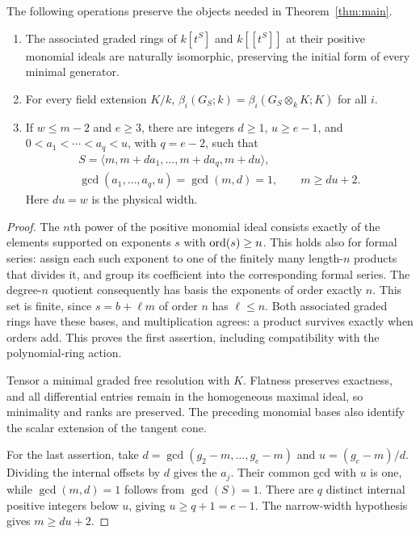 \begin{proposition}\label{prop:bridge}
The following operations preserve the objects needed in
Theorem~\ref{thm:main}.
\begin{enumerate}
\item The associated graded rings of $k[t^S]$ and $k[[t^S]]$ at their
positive monomial ideals are naturally isomorphic, preserving the
initial form of every minimal generator.
\item For every field extension $K/k$,
$\beta_i(G_S;k)=\beta_i(G_S\otimes_k K;K)$ for all $i$.
\item If $w\le m-2$ and $e\ge3$, there are integers $d\ge1$,
$u\ge e-1$, and $0<a_1<\cdots<a_q<u$, with $q=e-2$, such that
\begin{gather}\label{eq:normalization}
 S=\langle m,m+da_1,\ldots,m+da_q,m+du\rangle,\\
 \gcd(a_1,\ldots,a_q,u)=\gcd(m,d)=1,\qquad m\ge du+2.\nonumber
\end{gather}
Here $du=w$ is the physical width.
\end{enumerate}
\end{proposition}
\begin{proof}
The $n$th power of the positive monomial ideal consists exactly of the
elements supported on exponents $s$ with $\operatorname{ord}(s)\ge n$. This holds
also for formal series: assign each such exponent to one of the finitely
many length-$n$ products that divides it, and group its coefficient into
the corresponding formal series. The degree-$n$ quotient consequently
has basis the exponents of order exactly $n$. This set is finite, since
$s=b+\ell m$ of order $n$ has $\ell\le n$. Both associated graded
rings have these bases, and multiplication agrees: a product survives
exactly when orders add. This proves the first assertion, including
compatibility with the polynomial-ring action.

Tensor a minimal graded free resolution with $K$. Flatness preserves
exactness, and all differential entries remain in the homogeneous
maximal ideal, so minimality and ranks are preserved. The preceding
monomial bases also identify the scalar extension of the tangent cone.

For the last assertion, take
$d=\gcd(g_2-m,\ldots,g_e-m)$ and $u=(g_e-m)/d$.
Dividing the internal offsets by $d$ gives the $a_j$. Their common gcd
with $u$ is one, while $\gcd(m,d)=1$ follows from $\gcd(S)=1$.
There are $q$ distinct internal positive integers below $u$, giving
$u\ge q+1=e-1$. The narrow-width hypothesis gives $m\ge du+2$.
\end{proof}

